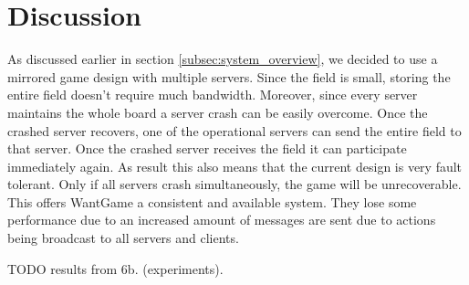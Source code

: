 \section{Discussion}


	As discussed earlier in section \ref{subsec:system_overview}, we decided to use a mirrored game design with multiple servers. 
	Since the field is small, storing the entire field doesn't require much bandwidth. 
	Moreover, since every server maintains the whole board a server crash can be easily overcome. 
	Once the crashed server recovers, one of the operational servers can send the entire field to that server. 
	Once the crashed server receives the field it can participate immediately again. 
	As result this also means that the current design is very fault tolerant. 
	Only if all servers crash simultaneously, the game will be unrecoverable.
	This offers WantGame a consistent and available system. 
	They lose some performance due to an increased amount of messages are sent due to actions being broadcast to all servers and clients.
	
	TODO results from 6b. (experiments).